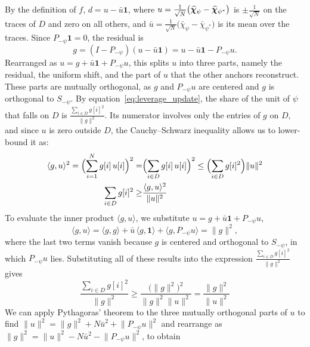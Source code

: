 \documentclass[titlepage,a4paper,11pt]{report}
\begin{document}
    By the definition of $f$, $d=u-\bar u\mathbf{1}$, where $u=\frac{1}{\sqrt N}\bigl(\bm{\widehat\chi}_\psi-\bm{\widehat\chi}_{\psi^\ast}\bigr)$ is $\pm\frac{1}{\sqrt N}$ on the traces of $D$ and zero on all others, and $\bar u=\frac{1}{\sqrt N}\bigl(\bar\chi_\psi-\bar\chi_{\psi^\ast}\bigr)$ is its mean over the traces. Since $P_{-\psi}\mathbf{1}=0$, the residual is
    \begin{equation}\label{eq:residual_from_difference}
        g=(I-P_{-\psi})(u-\bar u\mathbf{1})=u-\bar u\mathbf{1}-P_{-\psi}u.
    \end{equation}
    Rearranged as $u=g+\bar u\mathbf{1}+P_{-\psi}u$, this splits $u$ into three parts, namely the residual, the uniform shift, and the part of $u$ that the other anchors reconstruct. These parts are mutually orthogonal, as $g$ and $P_{-\psi}u$ are centered and $g$ is orthogonal to $S_{-\psi}$. By equation~\eqref{eq:leverage_update}, the share of the unit of $\psi$ that falls on $D$ is $\frac{\sum_{i\in D}g[i]^2}{\lVert g\rVert^2}$. Its numerator involves only the entries of $g$ on $D$, and since $u$ is zero outside $D$, the Cauchy--Schwarz inequality allows us to lower-bound it as:
    \begin{equation}\label{eq:inner_product_bound}
    \begin{split}
        \langle g,u\rangle^2=\Bigl(\sum_{i=1}^{N}g[i]\,u[i]\Bigr)^2=&\Bigl(\sum_{i\in D}g[i]\,u[i]\Bigr)^2\le\Bigl(\sum_{i\in D}g[i]^2\Bigr)\lVert u\rVert^2\\
        \sum_{i\in D}g[i]^2 \ge & \frac{\langle g,u\rangle^2}{\lVert u\rVert^2}
    \end{split}
    \end{equation}
    To evaluate the inner product $\langle g,u\rangle$, we substitute $u=g+\bar u\mathbf{1}+P_{-\psi}u$,
    \begin{equation*}
        \langle g,u\rangle=\langle g,g\rangle+\bar u\,\langle g,\mathbf{1}\rangle+\langle g,P_{-\psi}u\rangle=\lVert g\rVert^2,
    \end{equation*}
    where the last two terms vanish because $g$ is centered and orthogonal to $S_{-\psi}$, in which $P_{-\psi}u$ lies. Substituting all of these results into the expression $\frac{\sum_{i\in D}g[i]^2}{\lVert g\rVert^2}$ gives
    \begin{equation*}
        \frac{\sum_{i\in D}g[i]^2}{\lVert g\rVert^2} \ge \frac{\bigl(\lVert g\rVert^2\bigr)^2}{\lVert g\rVert^2 \lVert u\rVert^2} = \frac{\lVert g\rVert^2}{\lVert u\rVert^2}
    \end{equation*}
    We can apply Pythagoras' theorem to the three mutually orthogonal parts of $u$ to find $\lVert u \rVert^2 =\lVert g\rVert^2+N\bar u^2+\lVert P_{-\psi}u\rVert^2$ and rearrange as $\lVert g \rVert^2 =\lVert u\rVert^2-N\bar u^2-\lVert P_{-\psi}u\rVert^2$, to obtain
\end{document}
